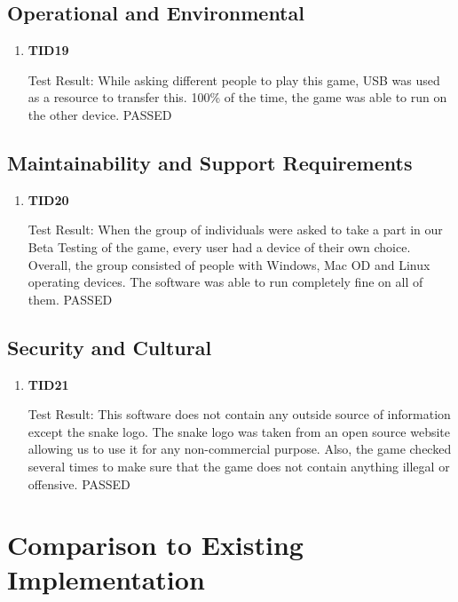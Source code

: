 \documentclass[12pt, titlepage]{article}
\begin{document}
\subsection{Operational and Environmental}
\begin{enumerate}
	
	\item{\textbf{TID19}\\}
	
	Test Result: While asking different people to play this game, USB was used as a resource to transfer this. 100\% of the time, the game was able to run on the other device. PASSED
	
\end{enumerate}

\subsection{Maintainability and Support Requirements}
\begin{enumerate}
	
	\item{\textbf{TID20}\\}
	
	Test Result: When the group of individuals were asked to take a part in our Beta Testing of the game, every user had a device of their own choice. Overall, the group consisted of people with Windows, Mac OD and Linux operating devices. The software was able to run completely fine on all of them. PASSED
	
\end{enumerate}

\subsection{Security and Cultural}
\begin{enumerate}
	
	\item{\textbf{TID21}\\}
	
	Test Result: This software does not contain any outside source of information except the snake logo. The snake logo was taken from an open source website allowing us to use it for any non-commercial purpose. Also, the game checked several times to make sure that the game does not contain anything illegal or offensive. PASSED
	
\end{enumerate}

\section{Comparison to Existing Implementation}	
\end{document}
